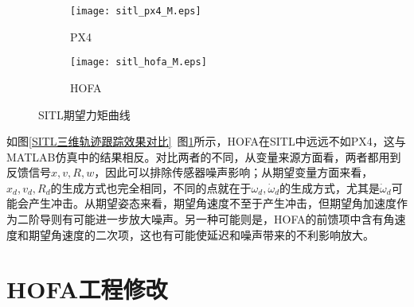\begin{figure}[H]
  \centering
\begin{subfigure}[b]{0.49\linewidth}
    \texttt{[image: sitl\_px4\_M.eps]}
    \caption{PX4}
\end{subfigure}
\hfill
\begin{subfigure}[b]{0.49\linewidth}
    \texttt{[image: sitl\_hofa\_M.eps]}
    \caption{HOFA}
\end{subfigure}
\caption{SITL期望力矩曲线}
\label{SITL期望力矩曲线}
\end{figure}

如图\ref{SITL三维轨迹跟踪效果对比}~图\ref{SITL期望力矩曲线}所示，HOFA在SITL中远远不如PX4，这与MATLAB仿真中的结果相反。对比两者的不同，从变量来源方面看，两者都用到反馈信号$x,v,R,w$，因此可以排除传感器噪声影响；从期望变量方面来看，$x_d,v_d,R_d$的生成方式也完全相同，不同的点就在于$\omega_d,\dot \omega_d$的生成方式，尤其是$\dot \omega_d$可能会产生冲击。从期望姿态来看，期望角速度不至于产生冲击，但期望角加速度作为二阶导则有可能进一步放大噪声。另一种可能则是，HOFA的前馈项中含有角速度和期望角速度的二次项，这也有可能使延迟和噪声带来的不利影响放大。

\section{HOFA工程修改}


